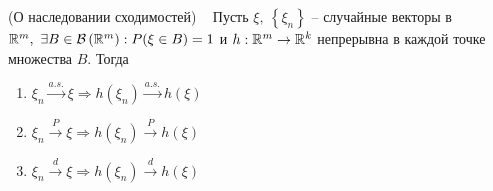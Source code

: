 \begin{theorem} (О наследовании сходимостей) ~
	Пусть $\xi,\ \left\{\xi_n\right\}$ -- случайные векторы в $\mathbb{R}^m,\ \exists B \in \mathcal{B}\left(\mathbb{R}^m\right) : P(\xi \in B) = 1$ и $h : \mathbb{R}^m \rightarrow \mathbb{R}^k$ непрерывна в каждой точке множества $B$. Тогда
	
	\begin{enumerate}
		\item $\xi_n\xrightarrow{a.s.} \xi \Rightarrow h\left(\xi_n\right) \xrightarrow{a.s.} h\left(\xi\right)$
		
		\item $\xi_n\xrightarrow{P} \xi \Rightarrow h\left(\xi_n\right) \xrightarrow{P} h\left(\xi\right)$
		
		\item $\xi_n\xrightarrow{d} \xi \Rightarrow h\left(\xi_n\right) \xrightarrow{d} h\left(\xi\right)$
	\end{enumerate}
	
\end{theorem}

